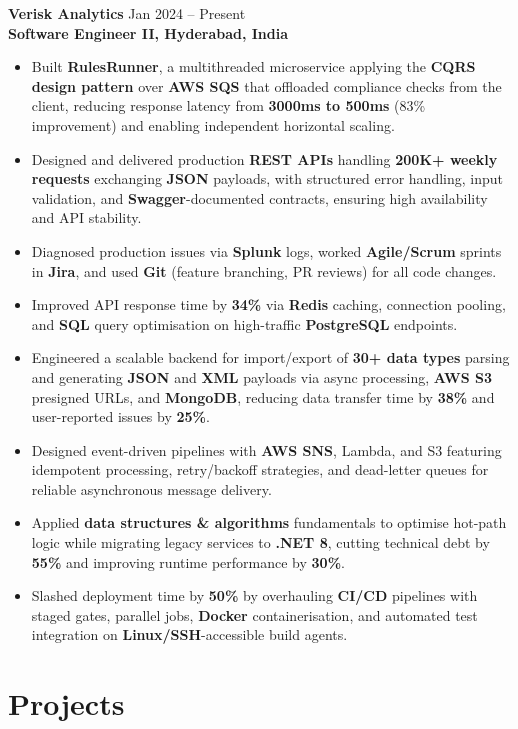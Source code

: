 \documentclass[a4paper,10pt]{article}
\begin{document}
\textbf{Verisk Analytics} \hfill Jan 2024 -- Present \\
\textbf{Software Engineer II, Hyderabad, India}
\begin{itemize}[leftmargin=*]
    \item Built \textbf{RulesRunner}, a multithreaded microservice applying the \textbf{CQRS design pattern} over \textbf{AWS SQS} that offloaded compliance checks from the client, reducing response latency from \textbf{3000ms to 500ms} (83\% improvement) and enabling independent horizontal scaling.
    \item Designed and delivered production \textbf{REST APIs} handling \textbf{200K+ weekly requests} exchanging \textbf{JSON} payloads, with structured error handling, input validation, and \textbf{Swagger}-documented contracts, ensuring high availability and API stability.
    \item Diagnosed production issues via \textbf{Splunk} logs, worked \textbf{Agile/Scrum} sprints in \textbf{Jira}, and used \textbf{Git} (feature branching, PR reviews) for all code changes.
    \item Improved API response time by \textbf{34\%} via \textbf{Redis} caching, connection pooling, and \textbf{SQL} query optimisation on high-traffic \textbf{PostgreSQL} endpoints.
    \item Engineered a scalable backend for import/export of \textbf{30+ data types} parsing and generating \textbf{JSON} and \textbf{XML} payloads via async processing, \textbf{AWS S3} presigned URLs, and \textbf{MongoDB}, reducing data transfer time by \textbf{38\%} and user-reported issues by \textbf{25\%}.
    \item Designed event-driven pipelines with \textbf{AWS SNS}, Lambda, and S3 featuring idempotent processing, retry/backoff strategies, and dead-letter queues for reliable asynchronous message delivery.
    \item Applied \textbf{data structures \& algorithms} fundamentals to optimise hot-path logic while migrating legacy services to \textbf{.NET 8}, cutting technical debt by \textbf{55\%} and improving runtime performance by \textbf{30\%}.
    \item Slashed deployment time by \textbf{50\%} by overhauling \textbf{CI/CD} pipelines with staged gates, parallel jobs, \textbf{Docker} containerisation, and automated test integration on \textbf{Linux/SSH}-accessible build agents.
\end{itemize}

\section*{Projects}
\end{document}
